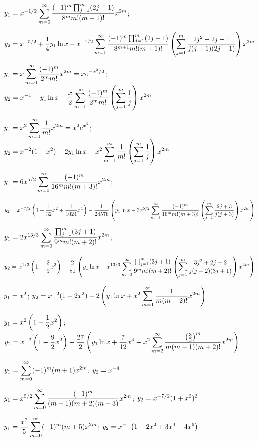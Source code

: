 $\displaystyle{y_{1}=x^{-1/2}\sum_{m=0}^{\infty}\frac{(-1)^{m}\prod_{j=1}^{m}(2j-1)}{8^{m}m!(m+1)!}
x^{2m}}$;\;

\quad\;  \;
$\displaystyle{y_{2}=x^{-5/2}+\frac{1}{4}y_{1}\ln x
-x^{-1/2}\sum_{m=1}^{\infty}\frac{(-1)^{m}\prod_{j=1}^{m}(2j-1)}{8^{m+1}m!(m+1)!}
\left(\sum_{j=1}^{m}\frac{2j^{2}-2j-1}{j(j+1)(2j-1)}\right)x^{2m}}$

$\displaystyle{y_{1}=x\sum_{m=0}^{\infty}\frac{(-1)^{m}}{2^{m}m!}x^{2m}=xe^{-x^{2}/2}}$;\;
$\displaystyle{y_{2}=x^{-1}-y_{1}\ln x+\frac{x}{2}
\sum_{m=1}^{\infty}\frac{(-1)^{m}}{2^{m}m!}\left(\sum_{j=1}^{m}\frac{1}{j}\right)x^{2m}}$

$\displaystyle{y_{1}=x^{2}\sum_{m=0}^{\infty}\frac{1}{m!}x^{2m}=x^{2}e^{x^{2}}}$;\;
$\displaystyle{y_{2}=x^{-2}(1-x^{2})-2y_{1}\ln x+x^{2}\sum_{m=1}^{\infty}\frac{1}{m!}\left(\sum_{j=1}^{m}\frac{1}{j}\right)x^{2m}}$

$\displaystyle{y_{1}=6x^{5/2}\sum_{m=0}^{\infty}\frac{(-1)^{m}}{16^{m}m!(m+3)!}x^{2m}}$;\;

\quad\;  \;
$\displaystyle{y_{2}=x^{-7/2}\left(1+\frac{1}{32}x^{2}+\frac{1}{1024}x^{4}\right)
-\frac{1}{24576}\left(y_{1}\ln x-3x^{5/2}
\sum_{m=1}^{\infty}\frac{(-1)^{m}}{16^{m}m!(m+3)!}
\left(\sum_{j=1}^{m}\frac{2j+3}{j(j+3)}\right)x^{2m}\right)}$

$\displaystyle{y_{1}=2x^{13/3}\sum_{m=0}^{\infty}\frac{\prod_{j=1}^{m}(3j+1)}{9^{m}m!(m+2)!}x^{2m}}$;\;

\quad\;  \;
$\displaystyle{y_{2}=x^{1/3}\left(1+\frac{2}{9}x^{2}\right)+\frac{2}{81}\left(
y_{1}\ln
x-x^{13/3}\sum_{m=0}^{\infty}\frac{\prod_{j=1}^{m}(3j+1)}{9^{m}m!(m+2)!}
\left(\sum_{j=1}^{m}\frac{3j^{2}+2j+2}{j(j+2)(3j+1)}\right)x^{2m}\right)}$

$\displaystyle{y_{1}=x^{2}}$;\;
$\displaystyle{y_{2}=x^{-2}(1+2x^{2})-2\left(y_{1}\ln x+x^{2}\sum_{m=1}^{\infty}\frac{1}{m(m+2)!}x^{2m}\right)}$

$\displaystyle{y_{1}=x^{2}\left(1-\frac{1}{2}x^{2}\right)}$;\;
$\displaystyle{y_{2}=x^{-2}\left(1+\frac{9}{2}x^{2}\right)-\frac{27}{2}\left(
y_{1}\ln x+\frac{7}{12}x^{4}-x^{2}\sum_{m=2}^{\infty}\frac{\left(\frac{3}{2}\right)^{m}}{m(m-1)(m+2)!}x^{2m}\right)}$

$y_{1}=\displaystyle{\sum_{m=0}^{\infty}(-1)^{m}(m+1)x^{2m}}$;\;
$y_{2}=\displaystyle{x^{-4}}$

$y_{1}=\displaystyle{x^{5/2}\sum_{m=0}^{\infty}\frac{(-1)^{m}}{(m+1)(m+2)(m+3)}x^{2m}}$;\;
$y_{2}=\displaystyle{x^{-7/2}(1+x^{2})^{2}}$

$y_{1}=\displaystyle\frac{x^{7}}{5}\sum_{m=0}^{\infty}(-1)^{m}(m+5)x^{2m}$;\;
$y_{2}=\displaystyle{x^{-1}\left(1-2x^{2}+3x^{4}-4x^{6}\right)}$

